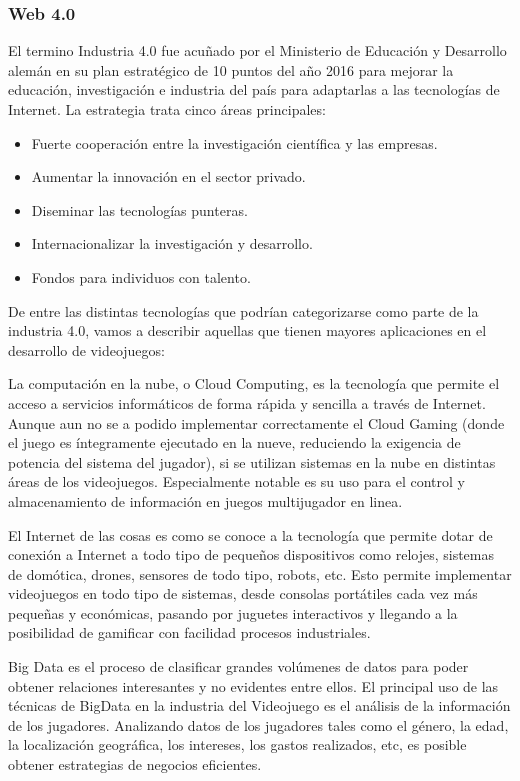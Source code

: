 \subsubsection{Web 4.0}
El termino Industria 4.0 fue acuñado por el Ministerio de Educación y Desarrollo alemán en su plan estratégico de 10 puntos del año 2016 para mejorar la educación, investigación e industria del país para adaptarlas a las tecnologías de Internet. La estrategia trata cinco áreas principales:
\begin{itemize}
\item Fuerte cooperación entre la investigación científica y las empresas.
\item Aumentar la innovación en el sector privado.
\item Diseminar las tecnologías punteras.
\item Internacionalizar la investigación y desarrollo.
\item Fondos para individuos con talento.
\end{itemize}

De entre las distintas tecnologías que podrían categorizarse como parte de la industria 4.0, vamos a describir aquellas que tienen mayores aplicaciones en el desarrollo de videojuegos:

La computación en la nube, o Cloud Computing, es la tecnología que permite el acceso a servicios informáticos de forma rápida y sencilla a través de Internet. Aunque aun no se a podido implementar correctamente el Cloud Gaming (donde el juego es íntegramente ejecutado en la nueve, reduciendo la exigencia de potencia del sistema del jugador), si se utilizan sistemas en la nube en distintas áreas de los videojuegos. Especialmente notable es su uso para el control y almacenamiento de información en juegos multijugador en linea.

El Internet de las cosas es como se conoce a la tecnología que permite dotar de conexión a Internet a todo tipo de pequeños dispositivos como relojes, sistemas de domótica, drones, sensores de todo tipo, robots, etc. Esto permite implementar videojuegos en todo tipo de sistemas, desde consolas portátiles cada vez más pequeñas y económicas, pasando por juguetes interactivos y llegando a la posibilidad de gamificar con facilidad procesos industriales.

Big Data es el proceso de clasificar grandes volúmenes de datos para poder obtener relaciones interesantes y no evidentes entre ellos. El principal uso de las técnicas de BigData en la industria del Videojuego es el análisis de la información de los jugadores. Analizando datos de los jugadores tales como el género, la edad, la localización geográfica, los intereses, los gastos realizados, etc, es posible obtener estrategias de negocios eficientes.


